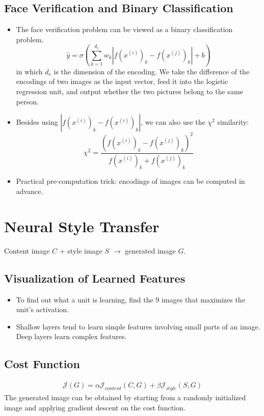 \subsection{Face Verification and Binary Classification}
\begin{itemize}
  \item The face verification problem can be viewed as a binary classification problem. 
  \[\hat{y}=\sigma\left(\displaystyle\sum_{k=1}^{d_e}w_k\left\vert f\left(x^{(i)}\right)_k-f\left(x^{(j)}\right)_k\right\vert+b\right)\]
  in which $d_e$ is the dimension of the encoding. We take the difference of the encodings of two images as the input vector, feed it into the logistic regression unit, and output whether the two pictures belong to the same person.
  \item Besides using $\left\vert f\left(x^{(i)}\right)_k-f\left(x^{(i)}\right)_k\right\vert$, we can also use the $\chi^2$ similarity:
  \[\chi^2=\frac{\left(f\left(x^{(i)}\right)_k-f\left(x^{(j)}\right)_k\right)^2}{f\left(x^{(i)}\right)_k+f\left(x^{(j)}\right)_k}\]
  \item Practical pre-computation trick: encodings of images can be computed in advance.
\end{itemize}
\section{Neural Style Transfer}
Content image $C$ + style image $S$ $\rightarrow$ generated image $G$.
\subsection{Visualization of Learned Features}
\begin{itemize}
  \item To find out what a unit is learning, find the 9 images that maximizes the unit's activation. 
  \item Shallow layers tend to learn simple features involving small parts of an image. Deep layers learn complex features.
\end{itemize}
\subsection{Cost Function}
\begin{align*}
  \mathcal{J}(G)=\alpha\mathcal{J}_{content}(C,G)+\beta\mathcal{J}_{style}(S,G)
\end{align*}
The generated image can be obtained by starting from a randomly initialized image and applying gradient descent on the cost function.
